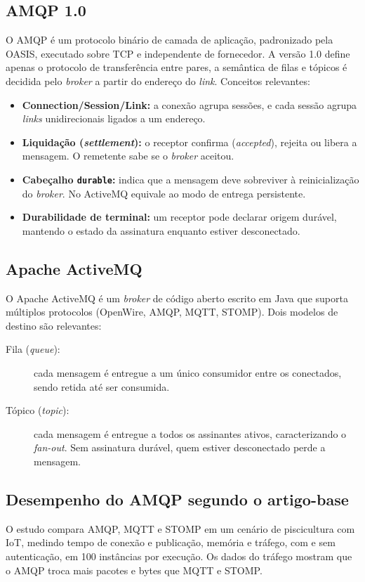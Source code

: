 \documentclass[12pt,a4paper]{article}
\begin{document}
\subsection{AMQP 1.0}
O AMQP é um protocolo binário de camada de aplicação, padronizado pela OASIS, executado sobre TCP e independente de fornecedor. A versão 1.0 define apenas o protocolo de transferência entre pares, a semântica de filas e tópicos é decidida pelo \textit{broker} a partir do endereço do \textit{link}. Conceitos relevantes:
\begin{itemize}
  \item \textbf{Connection/Session/Link:} a conexão agrupa sessões, e cada sessão agrupa \textit{links} unidirecionais ligados a um endereço.
  \item \textbf{Liquidação (\textit{settlement}):} o receptor confirma (\textit{accepted}), rejeita ou libera a mensagem. O remetente sabe se o \textit{broker} aceitou.
  \item \textbf{Cabeçalho \texttt{durable}:} indica que a mensagem deve sobreviver à reinicialização do \textit{broker}. No ActiveMQ equivale ao modo de entrega persistente.
  \item \textbf{Durabilidade de terminal:} um receptor pode declarar origem durável, mantendo o estado da assinatura enquanto estiver desconectado.
\end{itemize}

\subsection{Apache ActiveMQ}
O Apache ActiveMQ é um \textit{broker} de código aberto escrito em Java que suporta múltiplos protocolos (OpenWire, AMQP, MQTT, STOMP). Dois modelos de destino são relevantes:
\begin{description}
  \item[Fila (\textit{queue}):] cada mensagem é entregue a um único consumidor entre os conectados, sendo retida até ser consumida.
  \item[Tópico (\textit{topic}):] cada mensagem é entregue a todos os assinantes ativos, caracterizando o \textit{fan-out}. Sem assinatura durável, quem estiver desconectado perde a mensagem.
\end{description}

\subsection{Desempenho do AMQP segundo o artigo-base}
O estudo compara AMQP, MQTT e STOMP em um cenário de piscicultura com IoT, medindo tempo de conexão e publicação, memória e tráfego, com e sem autenticação, em 100 instâncias por execução. Os dados do tráfego mostram que o AMQP troca mais pacotes e bytes que MQTT e STOMP.
\end{document}
